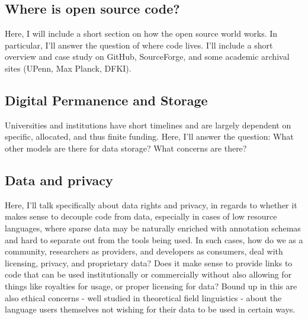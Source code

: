 %
%
%

\subsection{Where is open source code?}

Here, I will include a short section on how the open source world works. In particular, I'll answer the question of where code lives. I'll include a short overview and case study on GitHub, SourceForge, and some academic archival sites (UPenn, Max Planck, DFKI).

\subsection{Digital Permanence and Storage}

Universities and institutions have short timelines and are largely dependent on specific, allocated, and thus finite funding. Here, I'll answer the question: What other models are there for data storage? What concerns are there?

\subsection{Data and privacy}

Here, I'll talk specifically about data rights and privacy, in regards to whether it makes sense to decouple code from data, especially in cases of low resource languages, where sparse data may be naturally enriched with annotation schemas and hard to separate out from the tools being used. In such cases, how do we as a community, researchers as providers, and developers as consumers, deal with licensing, privacy, and proprietary data? Does it make sense to provide links to code that can be used institutionally or commercially without also allowing for things like royalties for usage, or proper licensing for data? Bound up in this are also ethical concerns - well studied in theoretical field linguistics - about the language users themselves not wishing for their data to be used in certain ways.

